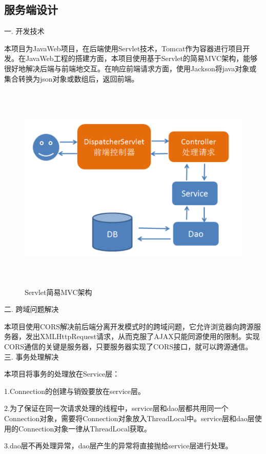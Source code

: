 \subsection{服务端设计}
\noindent
一. 开发技术

本项目为JavaWeb项目，在后端使用Servlet技术，Tomcat作为容器进行项目开发。在JavaWeb工程的搭建方面，本项目使用基于Servlet的简易MVC架构，能够很好地解决后端与前端地交互。在响应前端请求方面，使用Jackson将java对象或集合转换为json对象或数组后，返回前端。

\begin{figure}[H]
    \centering
    \includegraphics[width=15cm,height=10cm]{figures/MVC.png}
    \caption{Servlet简易MVC架构}
\end{figure}

\noindent
二. 跨域问题解决

本项目使用CORS解决前后端分离开发模式时的跨域问题，它允许浏览器向跨源服务器，发出XMLHttpRequest请求，从而克服了AJAX只能同源使用的限制。实现CORS通信的关键是服务器，只要服务器实现了CORS接口，就可以跨源通信。~\\

\noindent
三. 事务处理解决

本项目将事务的处理放在Service层：

1.Connection的创建与销毁要放在service层。

2.为了保证在同一次请求处理的线程中，service层和dao层都共用同一个Connection对象，需要将Connection对象放入ThreadLocal中。service层和dao层使用的Connection对象一律从ThreadLocal获取。

3.dao层不再处理异常，dao层产生的异常将直接抛给service层进行处理。

